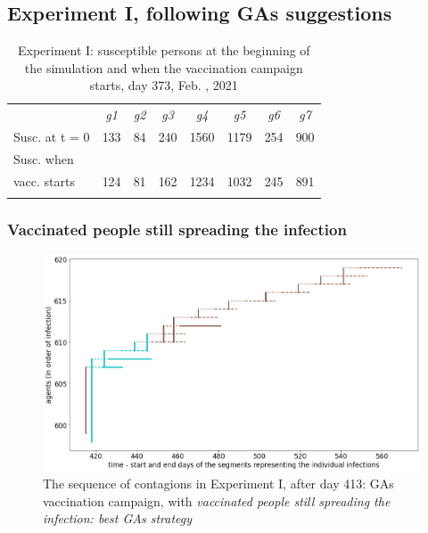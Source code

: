 \documentclass[graybox]{svmult}
\begin{document}
\subsection{Experiment I, following GAs suggestions}\label{GA_I}

\begin{table}[t]
\centering
\begin{tabular}{lccccccc}
\hline\noalign{\smallskip}
& \emph{g1} & \emph{g2} & \emph{g3} & \emph{g4} & \emph{g5} & \emph{g6} & \emph{g7} \\
\noalign{\smallskip}\svhline\noalign{\smallskip}
Susc. at t = 0                   & 133 & 84 & 240 & 1560 & 1179 & 254 & 900 \\
Susc. when\\vacc. starts & 124 & 81 & 162 & 1234 & 1032 & 245 & 891 \\
\hline\noalign{\smallskip} 
\end{tabular}
\caption{Experiment I: susceptible persons at the beginning of the simulation and when the vaccination campaign starts,  day 373, Feb. , 2021}
\label{susceptibleExperimentForGA_I}
\end{table}

\subsubsection{Vaccinated people still spreading the infection}

\begin{figure}[t]
\center
\includegraphics[scale=0.3]{ExperimentForGA_I_1>413bestGA.png} 

\caption{The sequence of contagions in Experiment I, after day 413: GAs vaccination campaign, with \emph{vaccinated people still spreading the infection: best GAs strategy}}
\label{ExperimentForGA_I_1>413bestGA}
\end{figure}
\end{document}
